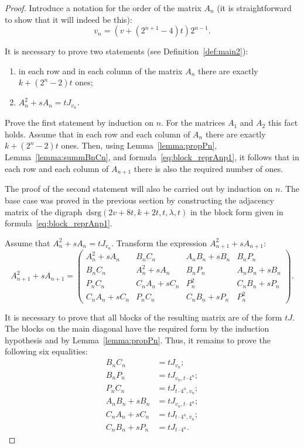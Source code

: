 \documentclass[10pt,a4paper]{amsart}
\begin{document}
\begin{proof}
Introduce a notation for the order of the matrix $A_n$ (it is straightforward to show that it will indeed be this):
\begin{equation}
    v_n = (v+(2^{n+1}-4)t)2^{n-1}.
\end{equation}

It is necessary to prove two statements (see Definition~\ref{def:main2}):
\begin{enumerate}
	\item in each row and in each column of the matrix $A_n$ there are exactly $k+(2^n-2)t$ ones;
	\item $A_n^2 + sA_n = tJ_{v_n}$.
\end{enumerate}

Prove the first statement by induction on $n$. For the matrices $A_1$ and $A_2$ this fact holds. Assume that in each row and each column of $A_n$ there are exactly $k+(2^n-2)t$ ones. Then, using Lemma~\ref{lemma:propPn}, Lemma~\ref{lemma:summBnCn}, and formula~\eqref{eq:block_reprAnp1}, it follows that in each row and each column of $A_{n+1}$ there is also the required number of ones.

The proof of the second statement will also be carried out by induction on $n$. The base case was proved in the previous section by constructing the adjacency matrix of the digraph~$\text{dsrg}(2v+8t, k+2t, t, \lambda, t)$ in the block form given in formula~\eqref{eq:block_reprAnp1}.

Assume that $A_n^2 + sA_n = tJ_{v_n}$. Transform the expression $A_{n+1}^2 + sA_{n+1}$:
\begin{equation}
A_{n+1}^2 + sA_{n+1} = 
\left(
\begin{array}{c|c|c|c}
	A_n^2+sA_n & B_n C_n & A_n B_n + sB_n & B_n P_n \\ \hline
	B_n C_n & A_n^2+sA_n & B_n P_n & A_n B_n + sB_n \\ \hline
	P_n C_n & C_n A_n + sC_n & P_n^2 & C_n B_n + sP_n \\ \hline
	C_n A_n + sC_n & P_n C_n & C_n B_n + sP_n & P_n^2
\end{array}
\right).
\end{equation}

It is necessary to prove that all blocks of the resulting matrix are of the form $tJ$. The blocks on the main diagonal have the required form by the induction hypothesis and by Lemma~\ref{lemma:propPn}. Thus, it remains to prove the following six equalities:
\begin{align}
B_n C_n &= tJ_{v_n}; \label{eq:system1}\\
B_n P_n &= tJ_{v_n, t\cdot{4^n}}; \label{eq:system2}\\
P_n C_n &= tJ_{t\cdot{4^n}, v_n}; \label{eq:system3}\\
A_n B_n + sB_n &= tJ_{v_n, t\cdot{4^n}}; \label{eq:system4}\\
C_n A_n + sC_n &= tJ_{t\cdot{4^n}, v_n}; \label{eq:system5}\\
C_n B_n + sP_n &= tJ_{t\cdot{4^n}} \label{eq:system6}.
\end{align}


\end{proof}
\end{document}
